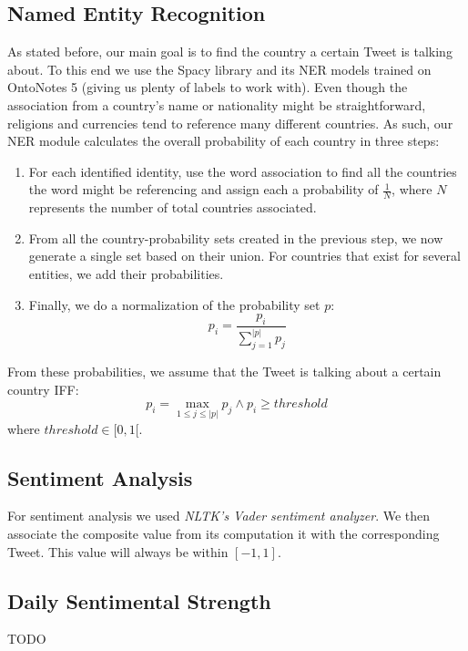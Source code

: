 \documentclass[11pt]{article}
\begin{document}
	\subsection{Named Entity Recognition}
	\label{sub:named_entity_recognition}
	As stated before, our main goal is to find the country a certain Tweet is talking about. To this end we use the Spacy library and its NER models trained on OntoNotes 5 (giving us plenty of labels to work with). Even though the association from a country's name or nationality might be straightforward, religions and currencies tend to reference many different countries. As such, our NER module calculates the overall probability of each country in three steps:
	\begin{enumerate}
		\item For each identified identity, use the word association to find all the countries the word might be referencing and assign each a probability of $\frac{1}{N}$, where $N$ represents the number of total countries associated.
		\item From all the country-probability sets created in the previous step, we now generate a single set based on their union. For countries that exist for several entities, we add their probabilities.
		\item Finally, we do a normalization of the probability set $p$:
		\begin{equation}
		p_i = \frac{p_{i}}{\sum_{j=1}^{|p|} p_j}
		\end{equation}
	\end{enumerate}
	
	From these probabilities, we assume that the Tweet is talking about a certain country IFF:
	\begin{equation}
	p_{i} = \max_{1 \leq j \leq |p|} p_{j} \wedge p_{i} \ge threshold
	\end{equation}
	where $threshold \in [0, 1[$.
	
	\subsection{Sentiment Analysis}
	\label{sub:sentiment_analysis}
	For sentiment analysis we used \textit{NLTK's Vader sentiment analyzer}. We then associate the composite value from its computation it with the corresponding Tweet. This value will always be within $[-1, 1]$.
	
	\subsection{Daily Sentimental Strength}
	\label{sub:daily_sentiment_strength}
	TODO
	
\end{document}
